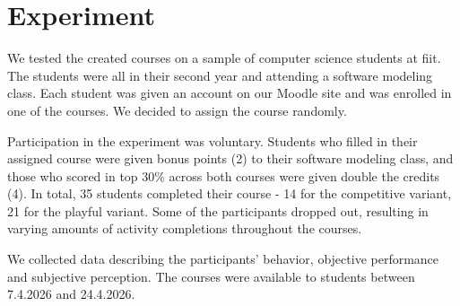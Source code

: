 \section{Experiment}

We tested the created courses on a sample of computer science students at \ac{fiit}. The students were all in their second year and attending a software modeling class. Each student was given an account on our Moodle site and was enrolled in one of the courses. We decided to assign the course randomly. %

Participation in the experiment was voluntary. Students who filled in their assigned course were given bonus points (2) to their software modeling class, and those who scored in top 30\% across both courses were given double the credits (4). In total, 35 students completed their course - 14 for the competitive variant, 21 for the playful variant. Some of the participants dropped out, resulting in varying amounts of activity completions throughout the courses. 

We collected data describing the participants' behavior, objective performance and subjective perception. The courses were available to students between 7.4.2026 and 24.4.2026.